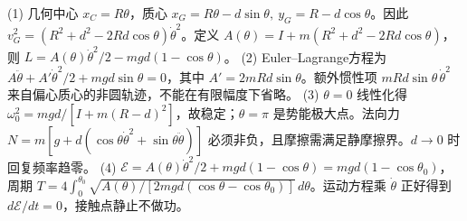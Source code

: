 (1) 几何中心 \(x_C=R\theta\)，质心 \(x_G=R\theta-d\sin\theta,\ y_G=R-d\cos\theta\)。因此 \(v_G^2=(R^2+d^2-2Rd\cos\theta)\dot\theta^2\)。定义 \(A(\theta)=I+m(R^2+d^2-2Rd\cos\theta)\)，则 \(L=A(\theta)\dot\theta^2/2-mgd(1-\cos\theta)\)。
(2) Euler--Lagrange方程为 \(A\ddot\theta+A'\dot\theta^2/2+mgd\sin\theta=0\)，其中 \(A'=2mRd\sin\theta\)。额外惯性项 \(mRd\sin\theta\,\dot\theta^2\) 来自偏心质心的非圆轨迹，不能在有限幅度下省略。
(3) \(\theta=0\) 线性化得 \(\omega_0^2=mgd/[I+m(R-d)^2]\)，故稳定；\(\theta=\pi\) 是势能极大点。法向力 \(N=m[g+d(\cos\theta\dot\theta^2+\sin\theta\ddot\theta)]\) 必须非负，且摩擦需满足静摩擦界。\(d\to0\) 时回复频率趋零。
(4) \(\mathcal E=A(\theta)\dot\theta^2/2+mgd(1-\cos\theta)=mgd(1-\cos\theta_0)\)，周期 \(T=4\int_0^{\theta_0}\sqrt{A(\theta)/[2mgd(\cos\theta-\cos\theta_0)]}\,d\theta\)。运动方程乘 \(\dot\theta\) 正好得到 \(d\mathcal E/dt=0\)，接触点静止不做功。
